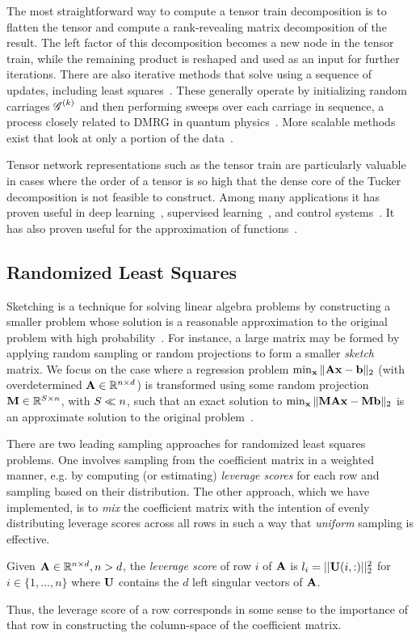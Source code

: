 The most straightforward way to compute a tensor train decomposition is to flatten the tensor and compute a rank-revealing matrix decomposition of the result. The left factor of this decomposition becomes a new node in the tensor train, while the remaining product is reshaped and used as an input for further iterations. There are also iterative methods that solve using a sequence of updates, including least squares~\cite{dttals1,ttals}. These generally operate by initializing random carriages $\T{G}^{(k)}$ and then performing sweeps over each carriage in sequence, a process closely related to DMRG in quantum physics~\cite{dmrg}. More scalable methods exist that look at only a portion of the data~\cite{ttcross}. 

Tensor network representations such as the tensor train are particularly valuable in cases where the order of a tensor is so high that the dense core of the Tucker decomposition is not feasible to construct. Among many applications it has proven useful in deep learning~\cite{ttrnn,ttnn}, supervised learning~\cite{supervisedtt}, and control systems~\cite{ttcontrol}. It has also proven useful for the approximation of functions~\cite{GoKaMa15}.

\subsection{Randomized Least Squares}
\label{sec:sketching}
Sketching is a technique for solving linear algebra problems by constructing 
a smaller problem whose solution is a 
reasonable approximation to the original problem with high probability~\cite{sketching}. 
For instance, a large matrix may be formed by applying random sampling or random 
projections to form a smaller \emph{sketch} matrix. 
We focus on the case where a regression
problem $\min_{\V{x}}\| \M{A}\V{x} - \V{b} \|_2$ (with overdetermined
$\M{A} \in \mathbb{R}^{n\times d}$) is transformed using some random
projection $\M{M} \in \mathbb{R}^{\samplesize\times n}$, with $S\ll
n$, such that an exact solution to $\min_{\V{x}}\| \M{M}\M{A}\V{x} -
\M{M}\V{b} \|_2$ is an approximate solution to the original
problem~\cite{rokhlintygert,DrMaMuSa11,blendenpik}.


There are two leading sampling approaches for randomized least squares
problems. One involves sampling from the coefficient matrix in a
weighted manner, e.g. by computing (or estimating) \emph{leverage
  scores} for each row and sampling based on their distribution. The
other approach, which we have implemented, is to \emph{mix} the
coefficient matrix with the intention of evenly distributing leverage scores
across all rows in such a way that \emph{uniform} sampling is
effective. 
\begin{definition}
Given $\M{A} \in \mathbb{R}^{n\times d}, n > d$, the \emph{leverage score} of row $i$ of $\M{A}$ is $l_i = ||\M{U}(i,:)||_2^2$
for $i \in \{1,\dots ,n\}$ where $\M{U}$ contains the $d$ left singular vectors of $\M{A}$.
\end{definition}
Thus, the leverage score of a row corresponds in some sense to the
importance of that row in constructing the column-space of the
coefficient matrix. 

